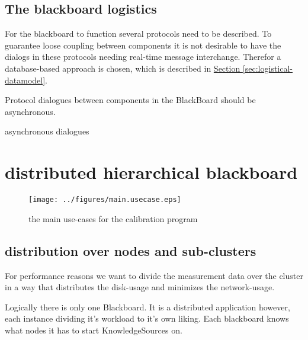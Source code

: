 \documentclass[]{lofar}
\begin{document}
    \subsection{The blackboard logistics}
    \label{subsec:blackboard-logistics}\hypertarget{subsec:blackboard-logistics}{}

      For the blackboard to function several protocols need to be
      described. To guarantee loose coupling between components it is
      not desirable to have the dialogs in these protocols needing
      real-time message interchange. Therefor a database-based
      approach is chosen, which is described in
      \hyperlink{sec:logistical-datamodel}{Section
      \ref{sec:logistical-datamodel}}.

      \begin{requirement}
        Protocol dialogues between components in the BlackBoard should
        be asynchronous.
        \caption{asynchronous dialogues\label{req:asynchronous}}
      \end{requirement}

  \section{distributed hierarchical blackboard}
  \label{sec:distributed-hierarchical-blackboard}\hypertarget{sec:distributed-hierarchical-blackboard}{}%

      \begin{figure}
        \texttt{[image: ../figures/main.usecase.eps]}
        \hypertarget{fig:main.usecase}{}
        \caption{the main use-cases for the calibration program\label{fig:main.usecase}}
      \end{figure}

    \subsection{distribution over nodes and sub-clusters}
    \label{subsec:distribution}\hypertarget{subsec:distribution}{}%

      For performance reasons we want to divide the measurement data
      over the cluster in a way that distributes the disk-usage and
      minimizes the network-usage.

      Logically there is only one Blackboard. It is a distributed
      application however, each instance dividing it's workload to
      it's own liking. Each blackboard knows what nodes it has to
      start KnowledgeSources on.
\end{document}
